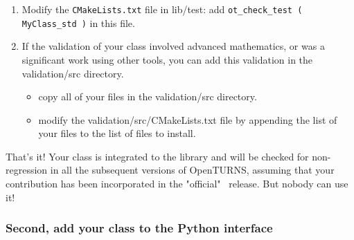 \begin{enumerate}
\item Modify the \verb!CMakeLists.txt! file in lib/test: add \verb!ot_check_test ( MyClass_std )! in this file.

\item If the validation of your class involved advanced mathematics, or was a significant work using other tools, you can add this validation in the validation/src directory.
\begin{itemize}
\item copy all of your files in the validation/src directory.
\item modify the validation/src/CMakeLists.txt file by appending the list of your files to the list of files to install.
\end{itemize}
\setcounter{oldenumi}{\value{enumi}}
\end{enumerate}

That's it! Your class is integrated to the library and will be checked for non-regression in all the subsequent versions of OpenTURNS, assuming that your contribution has been incorporated in the "official" \OT\ release. But nobody can use it!

\subsubsection{Second, add your class to the Python interface}

